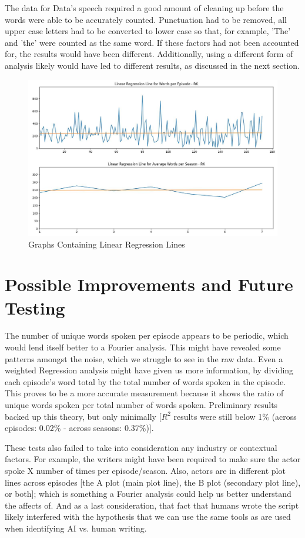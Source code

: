 \documentclass{article}
\begin{document}
The data for Data's speech required a good amount of cleaning up before the words were able to be accurately counted. Punctuation had to be removed, all upper case letters had to be converted to lower case so that, for example, 'The' and 'the' were counted as the same word. If these factors had not been accounted for, the results would have been different. Additionally, using a different form of analysis likely would have led to different results, as discussed in the next section.

\begin{figure}
    \centering
    \includegraphics[width=0.75\linewidth]{Screenshot from 2024-07-27 12-53-24.png}
    \caption{Graphs Containing Linear Regression Lines}
    \label{fig:enter-label}
\end{figure}

\section{Possible Improvements and Future Testing}

The number of unique words spoken per episode appears to be periodic, which would lend itself better to a Fourier analysis. This might have revealed some patterns amongst the noise, which we struggle to see in the raw data. Even a weighted Regression analysis might have given us more information, by dividing each episode's word total by the total number of words spoken in the episode. This proves to be a more accurate measurement because it shows the ratio of unique words spoken per total number of words spoken. Preliminary results backed up this theory, but only minimally [$R^2$ results were still below 1\% (across episodes: 0.02\% - across seasons: 0.37\%)].

These tests also failed to take into consideration any industry or contextual factors. For example, the writers might have been required to make sure the actor spoke X number of times per episode/season. Also, actors are in different plot lines across episodes [the A plot (main plot line), the B plot (secondary plot line), or both]; which is something a Fourier analysis could help us better understand the affects of. And as a last consideration, that fact that humans wrote the script likely interfered with the hypothesis that we can use the same tools as are used when identifying AI vs. human writing.
\end{document}
